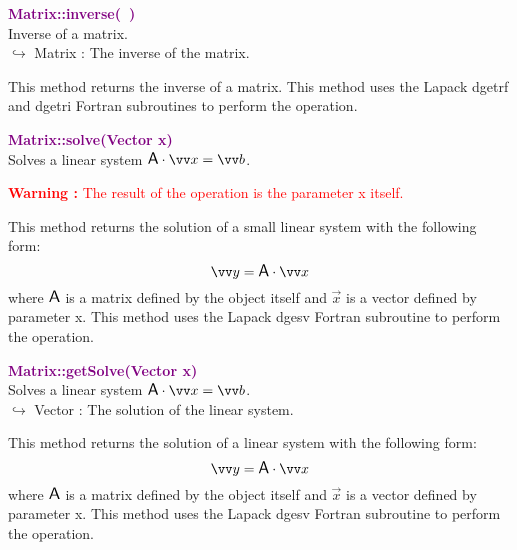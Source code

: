 \textcolor{purple}{\textbf{Matrix::inverse(~)}}\label{Matrix::inverse()}\\
Inverse of a matrix.\\ \hspace*{10mm}$\hookrightarrow$ Matrix : The inverse of the matrix.

This method returns the inverse of a matrix.
This method uses the Lapack \textsf{dgetrf} and \textsf{dgetri} Fortran subroutines to perform the operation.

\textcolor{purple}{\textbf{Matrix::solve(Vector x)}}\label{Matrix::solve(Vector x)}\\
Solves a linear system $\A\cdot \overrightarrow{x} = \overrightarrow{b}$.

\hspace*{10mm}\textcolor{red}{\textbf{Warning :}  The result of the operation is the parameter x itself.}

This method returns the solution of a small linear system with the following form:
\begin{equation*}
\overrightarrow{y} = \A \cdot \overrightarrow{x}
\end{equation*}
where $\mbox{\large\ensuremath{\mathsf{A}}}$ is a matrix defined by the object itself and $\overrightarrow{x}$ is a vector defined by parameter x.
This method uses the Lapack \textsf{dgesv} Fortran subroutine to perform the operation.

\textcolor{purple}{\textbf{Matrix::getSolve(Vector x)}}\label{Matrix::getSolve(Vector x)}\\
Solves a linear system $\A\cdot \overrightarrow{x} = \overrightarrow{b}$.\\ \hspace*{10mm}$\hookrightarrow$ Vector : The solution of the linear system.

This method returns the solution of a linear system with the following form:
\begin{equation*}
\overrightarrow{y} = \A \cdot \overrightarrow{x}
\end{equation*}
where $\mbox{\large\ensuremath{\mathsf{A}}}$ is a matrix defined by the object itself and $\overrightarrow{x}$ is a vector defined by parameter x.
This method uses the Lapack \textsf{dgesv} Fortran subroutine to perform the operation.

